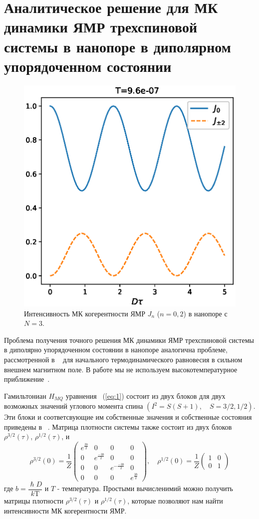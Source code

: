 \documentclass[utf8]{jetp}
\begin{document}
\section{Аналитическое решение для МК динамики ЯМР трехспиновой системы в нанопоре в диполярном упорядоченном состоянии}
\label{sec:3}

\begin{figure}
    \centering
  	\includegraphics[width=0.5\linewidth]{coherences_n3_beta5.eps}
	\caption{
	    Интенсивность МК когерентности ЯМР $J_{n}$ ($n=0, 2$) в нанопоре с $N=3$.
	}
	\label{fig:1}
\end{figure}

Проблема получения точного решения МК динамики ЯМР трехспиновой системы в диполярно упорядоченном состоянии в нанопоре аналогична проблеме, рассмотренной в ~\cite{Doronin_2019} для начального термодинамического равновесия в сильном внешнем магнитном поле.
В работе мы не используем высокотемпературное приближение~\cite{Goldman_1970}.

Гамильтониан $H_{MQ}$ уравнения ~(\ref{eq:1}) состоит из двух блоков для двух возможных значений углового момента спина $(I^2 = S(S+1),  \quad S=3/2,1/2)$.
Эти блоки и соответсвующие им собственные значения и собственные состояния приведены в ~\cite{Doronin_2019}.
Матрица плотности системы также состоит из двух блоков $\rho^{3/2}(\tau)$, $\rho^{1/2}(\tau)$, и
%
\begin{equation}
    \label{eq:15} 
    \rho^{3/2}(0) = \dfrac 1 Z
    \begin{pmatrix}
        e^{\frac{3b}{2}} & 0 & 0 & 0 
        \\
        0 & e^{\frac{-3b}{2}} & 0 & 0 
        \\
        0 & 0 & e^{-\frac{-3b}{2}} & 0 
        \\
        0 & 0 & 0 & e^{\frac{3b}{2}}
    \end{pmatrix}, 
    \quad
    \rho^{1/2}(0) = \dfrac 1 Z
    \begin{pmatrix}
       	1 & 0 
        \\
        0 & 1
    \end{pmatrix}
\end{equation}
%
где $b = \dfrac{\hslash D}{k\mathrm{T}}$ и $T$ - температура.
Простыми вычисленимий можно получить матрицы плотности $\rho^{3/2}(\tau)$ и $\rho^{1/2}(\tau)$,
которые позволяют нам найти интенсивности МК когерентности ЯМР.
\end{document}

